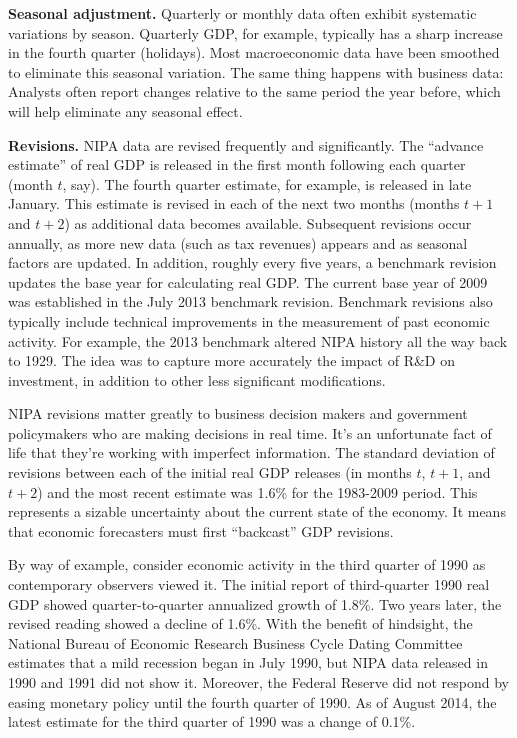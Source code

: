 \textbf{Seasonal adjustment. }
Quarterly or monthly data often exhibit systematic variations by season.
Quarterly GDP, for example, typically has a sharp increase in the fourth quarter
(holidays).
Most macroeconomic data have been smoothed to eliminate this seasonal variation.
The same thing happens with business data: Analysts often report changes relative to the same period the year before,
which will help eliminate any seasonal effect.

\textbf{Revisions.}
NIPA data are revised frequently and significantly. The ``advance estimate''
of real GDP  is released in the first month following each quarter (month $t$, say).
The fourth quarter estimate, for example, is released in late January.
This estimate is revised in each of the next two months (months $t+1$ and $t+2$)
as additional data becomes available.
Subsequent revisions occur annually, as more new data (such as tax revenues) appears
and as seasonal factors are updated. In addition, roughly every five years,
a benchmark revision updates the base year for calculating real GDP. The current
base year of 2009 was established in the July 2013 benchmark revision. Benchmark
revisions also typically include technical improvements in the measurement of
past economic activity. For example, the 2013 benchmark altered NIPA history
all the way back to 1929.
The idea was to capture more accurately the impact of R\&D on investment,
in addition to other less significant modifications.


NIPA revisions matter greatly to business decision makers and
government policymakers who are making decisions in real time.
It's an unfortunate fact of life that they're working with imperfect information.
The standard deviation of revisions between each of the initial real GDP releases
(in months $t$, $t+1$, and $t+2$) and the most recent estimate was 1.6\%
for the 1983-2009 period. This represents a sizable uncertainty about
the current state of the economy. It means
that economic forecasters must first ``backcast'' GDP revisions.

By way of example, consider economic activity in the third quarter of
1990 as contemporary observers viewed it.
The initial report of third-quarter 1990
real GDP showed quarter-to-quarter annualized growth of 1.8\%.
Two years later, the revised reading showed a decline of 1.6\%.
With the benefit of hindsight, the National
Bureau of Economic Research Business Cycle Dating Committee estimates that a
mild recession began in July 1990, but NIPA data released in 1990 and 1991 did
not show it. Moreover, the Federal Reserve did not respond by easing monetary policy
until the fourth quarter of 1990.
As of August 2014, the latest estimate for the third quarter of 1990 was a change
of 0.1\%.



